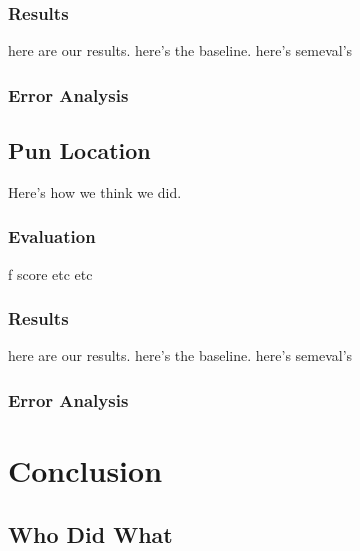 \documentclass{article}
\begin{document}
\subsubsection{Results}
here are our results. here's the baseline. here's semeval's

\subsubsection{Error Analysis}

\subsection{Pun Location}
Here's how we think we did.
\subsubsection{Evaluation}
f score etc etc
\subsubsection{Results}
here are our results. here's the baseline. here's semeval's
\subsubsection{Error Analysis}


\section{Conclusion}
\label{conclusion}

\subsection{Who Did What}
\end{document}
